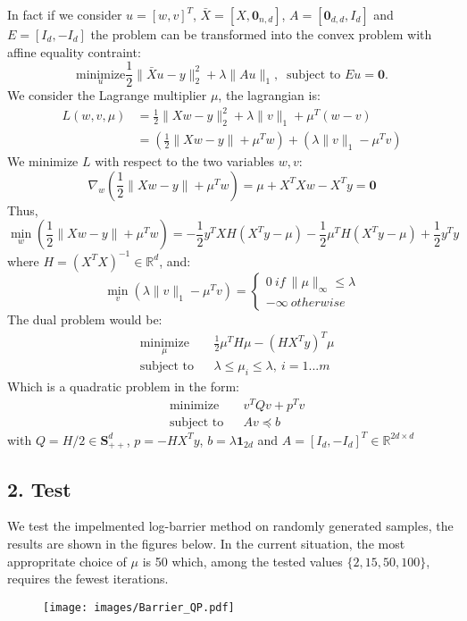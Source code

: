 \documentclass[11pt]{article}
\theoremstyle{exo}
\newcommand{\R}{\mathbb{R}}
\newcommand{\1}{\mathbf{1}}
\newcommand{\0}{\mathbf{0}}
\begin{document}
In fact if we consider $u=[w,v]^T$, $\bar X=[X, \0_{n,d}]$, $A=[\0_{d,d},I_d]$ and $E=[I_d,-I_d]$ the problem can be transformed into the convex problem with affine equality contraint:
\[\underset{u}{\text{minimize}} \frac{1}{2}\|\bar Xu-y\|_2^2+\lambda\|Au\|_1,\:\text{ subject to }Eu=\0.\]
We consider the Lagrange multiplier $\mu$, the lagrangian is:
\[\begin{split}
L(w,v,\mu)&=\frac{1}{2}\|Xw-y\|_2^2+\lambda\|v\|_1+\mu^T(w-v)\\
&=(\frac{1}{2}\|Xw-y\|+\mu^Tw)+(\lambda\|v\|_1-\mu^Tv)
\end{split}\] 
We minimize $L$ with respect to the two variables $w,v$:
\[\nabla_w(\frac{1}{2}\|Xw-y\|+\mu^Tw)=\mu+X^TXw-X^Ty=\0\]
Thus,
\[\min_w(\frac{1}{2}\|Xw-y\|+\mu^Tw)=-\frac{1}{2}y^TXH(X^Ty-\mu)-\frac{1}{2}\mu^TH(X^Ty-\mu)+\frac{1}{2}y^Ty\]
where $H=(X^TX)^{-1}\in\R^d$, and:
\[\min_v(\lambda\|v\|_1-\mu^Tv)=
\begin{cases}
0\:if\:\|\mu\|_\infty \leq \lambda\\
-\infty \:otherwise
\end{cases}\]
The dual problem would be:
\begin{equation}
\label{P1}
\begin{aligned}
& \underset{\mu}{\text{minimize}}& & \frac{1}{2}\mu^TH\mu-(HX^Ty)^T\mu \\
& \text{subject to} & & \lambda \leq \mu_i\leq \lambda, \:i=1...m
\end{aligned}
\end{equation}
Which is a quadratic problem in the form:
\begin{equation}
\label{QP}
\tag{QP}
\begin{aligned}
& {\text{minimize}} & & v^TQv+p^Tv\\
& \text{subject to} & & Av\preceq b
\end{aligned}
\end{equation}
with $Q=H/2\in\mathbf{S}^d_{++}$, $p=-HX^Ty$, $b=\lambda\1_{2d}$ and $A=[I_d,-I_d]^T\in\R^{2d\times d}$ 
\subsection*{2. Test}
We test the impelmented log-barrier method on randomly generated samples, the results are shown in the figures below. In the current situation, the most appropritate choice of $\mu$ is 50 which, among the tested values $\{2,15,50,100\}$, requires the fewest iterations. 
\begin{figure}[H]
\centering
\texttt{[image: images/Barrier\_QP.pdf]}
\end{figure}
\end{document}

